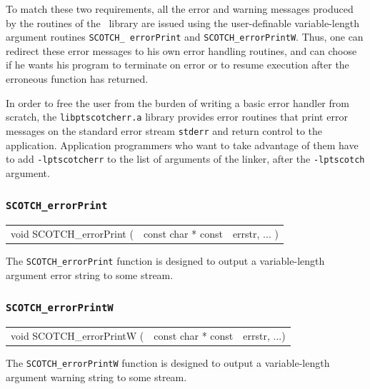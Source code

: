 To match these two requirements, all the error and warning messages
produced by the routines of the \libscotch\ library are issued using
the user-definable variable-length argument routines {\tt SCOTCH\_\lbt
error\lbt Print} and {\tt SCOTCH\_\lbt error\lbt PrintW}. Thus, one
can redirect these error messages to his own error handling routines,
and can choose if he wants his program to terminate on error or to
resume execution after the erroneous function has returned.

In order to free the user from the burden of writing a basic error
handler from scratch, the {\tt libptscotcherr.a} library provides error
routines that print error messages on the standard error stream
{\tt stderr} and return control to the application. Application
programmers who want to take advantage of them have to add
{\tt -lptscotcherr} to the list of arguments of the linker, after
the {\tt -lptscotch} argument.

\subsubsection{{\tt SCOTCH\_errorPrint}}
\label{sec-lib-func-errorprint}

\begin{itemize}
\progsyn

{\tt\begin{tabular}{l@{}ll}
void SCOTCH\_errorPrint ( & const char * const & errstr, ... )
\end{tabular}}

\progdes

The {\tt SCOTCH\_errorPrint} function is designed to output a
variable-length argument error string to some stream.
\end{itemize}

\subsubsection{{\tt SCOTCH\_errorPrintW}}

\begin{itemize}
\progsyn

{\tt\begin{tabular}{l@{}ll}
void SCOTCH\_errorPrintW ( & const char * const & errstr, ...)
\end{tabular}}

\progdes

The {\tt SCOTCH\_errorPrintW} function is designed to output a
variable-length argument warning string to some stream.
\end{itemize}

